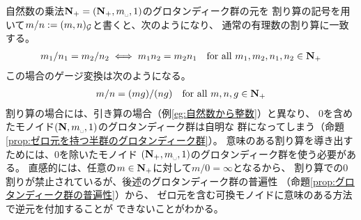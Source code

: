 	\begin{example}[自然数から有理数]\label{eg:自然数から有理数} %
		自然数の乗法$\sizen_+=(\sizen_+,m_\myspace,1)$のグロタンディーク群の元を
		割り算の記号を用いて$m/n:=(m,n)_{{\mathcal{G}}}$と書くと、次のようになり、
		通常の有理数の割り算に一致する。
		\begin{equation*}\begin{split}
			m_1/n_1 = m_2/n_2 \iff m_1n_2 = m_2n_1
			\quad\text{for all }m_1,m_2,n_1,n_2\in \mathbf{N}_+
		\end{split}\end{equation*}
		この場合のゲージ変換は次のようになる。
		\begin{equation*}\begin{split}
			m / n = (m g) / (n g) \quad\text{for all }m,n,g\in \mathbf{N}_+
		\end{split}\end{equation*}
		割り算の場合には、引き算の場合（例\ref{eg:自然数から整数}）と異なり、
		$0$を含めたモノイド$(\sizen,m_\myspace,1)$のグロタンディーク群は自明な
		群になってしまう（命題\ref{prop:ゼロ元を持つ半群のグロタンディーク群}）。
		意味のある割り算を導き出すためには、$0$を除いたモノイド
		$(\sizen_+,m_\myspace,1)$のグロタンディーク群を使う必要がある。
		直感的には、任意の$m\in\mathbf{N}_+$に対して$m/0=\infty$となるから、
		割り算での$0$割りが禁止されているが、後述のグロタンディーク群の普遍性
		（命題\ref{prop:グロタンディーク群の普遍性}）から、
		ゼロ元を含む可換モノイドに意味のある方法で逆元を付加することが
		できないことがわかる。
	\end{example} %

